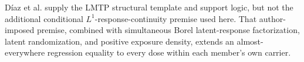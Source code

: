 Díaz et al. supply the LMTP structural template and support logic, but not the additional conditional \(L^1\)-response-continuity premise used here. That author-imposed premise, combined with simultaneous Borel latent-response factorization, latent randomization, and positive exposure density, extends an almost-everywhere regression equality to every dose within each member's own carrier.